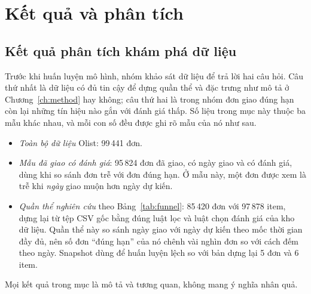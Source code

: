 \chapter{Kết quả và phân tích}\label{ch:results}

\section{Kết quả phân tích khám phá dữ liệu}\label{sec:eda}

Trước khi huấn luyện mô hình, nhóm khảo sát dữ liệu để trả lời hai câu hỏi. Câu thứ nhất là dữ liệu có đủ tin cậy để dựng quần thể và đặc trưng như mô tả ở Chương~\ref{ch:method} hay không; câu thứ hai là trong nhóm đơn giao đúng hạn còn lại những tín hiệu nào gắn với đánh giá thấp. Số liệu trong mục này thuộc ba mẫu khác nhau, và mỗi con số đều được ghi rõ mẫu của nó như sau.
\begin{itemize}
  \item \emph{Toàn bộ dữ liệu} Olist: 99\,441 đơn.
  \item \emph{Mẫu đã giao có đánh giá}: 95\,824 đơn đã giao, có ngày giao và có đánh giá, dùng khi so sánh đơn trễ với đơn đúng hạn. Ở mẫu này, một đơn được xem là trễ khi \emph{ngày} giao muộn hơn ngày dự kiến.
  \item \emph{Quần thể nghiên cứu} theo Bảng~\ref{tab:funnel}: 85\,420 đơn với 97\,878 item, dựng lại từ tệp CSV gốc bằng đúng luật lọc và luật chọn đánh giá của kho dữ liệu. Quần thể này so sánh ngày giao với ngày dự kiến theo mốc thời gian đầy đủ, nên số đơn ``đúng hạn'' của nó chênh vài nghìn đơn so với cách đếm theo ngày. Snapshot dùng để huấn luyện lệch so với bản dựng lại 5 đơn và 6 item.
\end{itemize}
Mọi kết quả trong mục là mô tả và tương quan, không mang ý nghĩa nhân quả.


